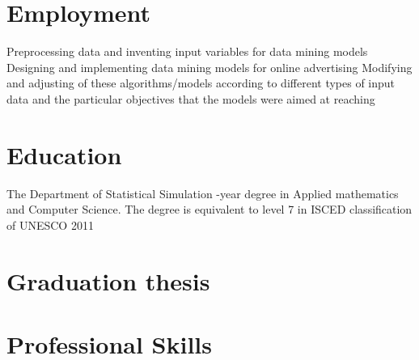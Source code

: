 \documentclass[11pt,a4paper]{moderncv-xetex}
\begin{document}
\maketitle
\section{Employment}
 \newline
    {Preprocessing data and inventing input variables for data mining models \newline
    Designing and implementing data mining models for online advertising \newline
    Modifying and adjusting of these algorithms/models according to different types of input data and the particular objectives that the models were aimed at reaching}
\section{Education}
\newline
    {
    The Department of Statistical Simulation -year degree in Applied mathematics and Computer Science. The degree is equivalent to level 7 in ISCED classification of UNESCO 2011
    }
\section{Graduation thesis}

\section{Professional Skills}


\end{document}
